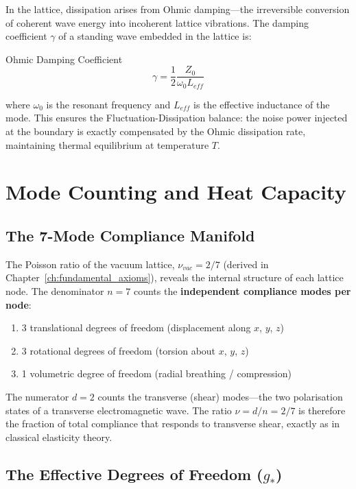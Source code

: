 In the lattice, dissipation arises from Ohmic damping---the irreversible conversion of coherent wave energy into incoherent lattice vibrations. The damping coefficient $\gamma$ of a standing wave embedded in the lattice is:
\begin{resultbox}{Ohmic Damping Coefficient}
\begin{equation}
    \gamma = \frac{1}{2} \frac{Z_0}{\omega_0 L_{eff}}
    \label{eq:damping_coefficient}
\end{equation}
\end{resultbox}
where $\omega_0$ is the resonant frequency and $L_{eff}$ is the effective inductance of the mode. This ensures the Fluctuation-Dissipation balance: the noise power injected at the boundary is exactly compensated by the Ohmic dissipation rate, maintaining thermal equilibrium at temperature $T$.

\section{Mode Counting and Heat Capacity}
\label{sec:mode_counting}

\subsection{The 7-Mode Compliance Manifold}

The Poisson ratio of the vacuum lattice, $\nu_{vac} = 2/7$ (derived in Chapter~\ref{ch:fundamental_axioms}), reveals the internal structure of each lattice node. The denominator $n = 7$ counts the \textbf{independent compliance modes per node}:
\begin{enumerate}
    \item 3 translational degrees of freedom (displacement along $x$, $y$, $z$)
    \item 3 rotational degrees of freedom (torsion about $x$, $y$, $z$)
    \item 1 volumetric degree of freedom (radial breathing / compression)
\end{enumerate}

The numerator $d = 2$ counts the transverse (shear) modes---the two polarisation states of a transverse electromagnetic wave. The ratio $\nu = d/n = 2/7$ is therefore the fraction of total compliance that responds to transverse shear, exactly as in classical elasticity theory.

\subsection{The Effective Degrees of Freedom ($g_*$)}

